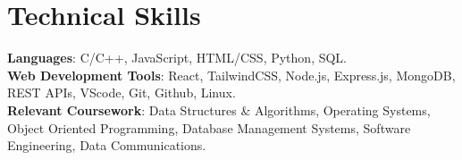 \documentclass[letterpaper,11pt]{article}
\makeatletter
\newcommand{\resumeSubheading}[4]{
  \vspace{-5pt}\item
    \begin{tabular*}{1.0\textwidth}[t]{l@{\extracolsep{\fill}}r}
      \textbf{#1} & \textbf{\small #2} \\
      \textit{\small#3} & \textit{\small #4} \\
    \end{tabular*}\vspace{-5pt}
}
\newcommand{\resumeSubHeadingListStart}{\begin{itemize}[leftmargin=0.0in, label={}]}
\newcommand{\resumeItemListStart}{\begin{itemize}}
\makeatother
\begin{document}
\section{\textbf{Technical Skills}}
 \begin{itemize}[leftmargin=0.00in, label={}]
    \small{\item{
     \textbf{Languages}{: C/C++, JavaScript, HTML/CSS, Python, SQL. } \\ 
     \textbf{Web Development Tools}{: React, TailwindCSS, Node.js, Express.js, MongoDB, REST APIs, VScode, Git, Github, Linux. } \\
     \textbf{Relevant Coursework}{: Data Structures \& Algorithms, Operating Systems, Object Oriented Programming, Database Management Systems, Software Engineering, Data Communications. } \\ 
    }}
 \end{itemize}
 
 \vspace{-12pt}

\end{document}
